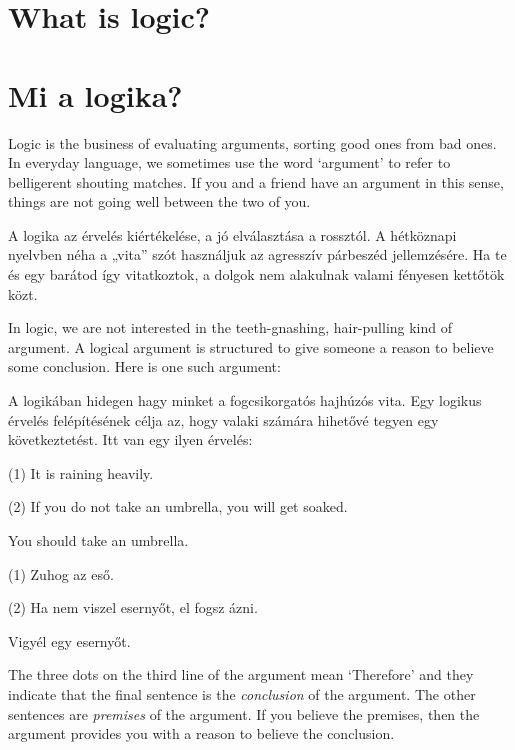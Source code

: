 

\chapter*{What is logic?}
\chapter{Mi a logika?}
\label{ch.intro}

Logic is the business of evaluating arguments, sorting good ones from bad ones. In everyday language, we sometimes use the word `argument' to refer to belligerent shouting matches. If you and a friend have an argument in this sense, things are not going well between the two of you.

A logika az érvelés kiértékelése, a jó elválasztása a rossztól. A hétköznapi nyelvben néha a „vita” szót használjuk az agresszív párbeszéd jellemzésére. Ha te és egy barátod így vitatkoztok, a dolgok nem alakulnak valami fényesen kettőtök közt.

In logic, we are not interested in the teeth-gnashing, hair-pulling kind of argument. A logical argument is structured to give someone a reason to believe some conclusion. Here is one such argument:

A logikában hidegen hagy minket a fogcsikorgatós hajhúzós vita. Egy logikus érvelés felépítésének célja az, hogy valaki számára hihetővé tegyen egy következtetést. Itt van egy ilyen érvelés:

\label{argRaining}
\begin{earg}
\item[(1)] It is raining heavily.
\item[(2)] If you do not take an umbrella, you will get soaked.
\item[\therefore] You should take an umbrella.
\end{earg}

\label{argRaining}
\begin{earg}
\item[(1)] Zuhog az eső.
\item[(2)] Ha nem viszel esernyőt, el fogsz ázni.
\item[\therefore] Vigyél egy esernyőt.
\end{earg}

The three dots on the third line of the argument mean `Therefore' and they indicate that the final sentence is the \emph{conclusion} of the argument. The other sentences are \emph{premises} of the argument. If you believe the premises, then the argument provides you with a reason to believe the conclusion.

